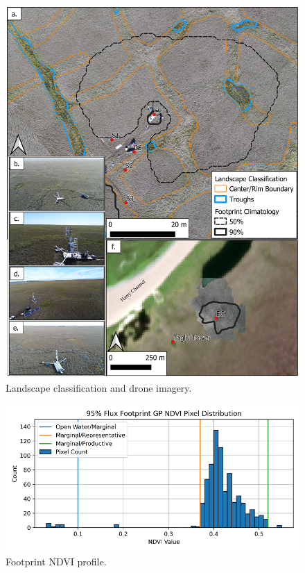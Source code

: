 \documentclass[
]{book}
\begin{document}
\begin{figure}
\includegraphics[width=1\linewidth]{images/16-fig2} \caption{Landscape classification and drone imagery.}\label{fig:16-fig2}
\end{figure}

\begin{figure}
\includegraphics[width=1\linewidth]{images/16-fig3} \caption{Footprint NDVI profile.}\label{fig:16-fig3}
\end{figure}
\end{document}

